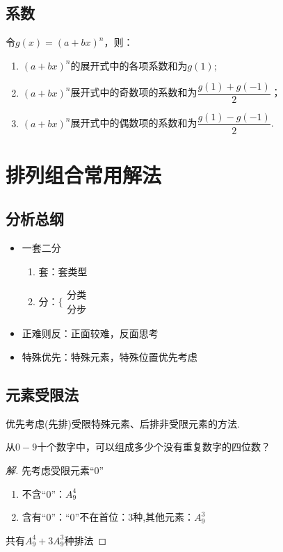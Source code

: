 \documentclass[marginline,noindent,answers,adobefonts]{BHCexam}
\begin{document}
\subsection{系数}
令$ g(x)=(a+bx)^n $，则：
\begin{enumerate}[1)]
\item $(a+bx)^n$的展开式中的各项系数和为$ g(1) $;
\item $(a+bx)^n$展开式中的奇数项的系数和为$ \dfrac{g(1)+g(-1)}{2} $；
\item $(a+bx)^n$展开式中的偶数项的系数和为$ \dfrac{g(1)-g(-1)}{2} $.
\end{enumerate}
\newpage 
\section{排列组合常用解法}
\subsection{分析总纲}
\begin{itemize}
\item 一套二分
\begin{enumerate}[(1)]
\item 套：套类型
\item 分：$\Bigg\{\begin{aligned}
\text{分类}\\\text{分步}
\end{aligned}$
\end{enumerate}
\item 正难则反：正面较难，反面思考
\item 特殊优先：特殊元素，特殊位置优先考虑
\end{itemize}
\subsection{元素受限法}
 优先考虑(先排)受限特殊元素、后排非受限元素的方法.\par
\begin{example}
从$0-9$十个数字中，可以组成多少个没有重复数字的四位数？
\begin{proof}[解]
先考虑受限元素“$0$”\begin{enumerate}[1)]
\item 不含“0”：$A_9^4$
\item 含有“0”：“0”不在首位：3种,其他元素：$A_9^3$
\end{enumerate}
共有$ A_9^4+3A_9^3 $种排法
\end{proof}
\end{example}
\end{document}
